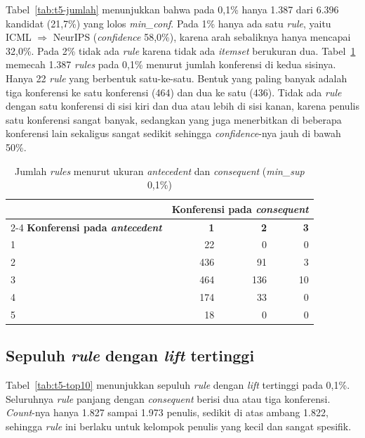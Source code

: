 Tabel~\ref{tab:t5-jumlah} menunjukkan bahwa pada 0,1\% hanya 1.387 dari 6.396 kandidat (21,7\%) yang lolos \textit{min\_conf}. Pada 1\% hanya ada satu \textit{rule}, yaitu ICML $\Rightarrow$ NeurIPS (\textit{confidence} 58,0\%), karena arah sebaliknya hanya mencapai 32,0\%. Pada 2\% tidak ada \textit{rule} karena tidak ada \textit{itemset} berukuran dua. Tabel~\ref{tab:t5-bentuk} memecah 1.387 \textit{rules} pada 0,1\% menurut jumlah konferensi di kedua sisinya. Hanya 22 \textit{rule} yang berbentuk satu-ke-satu. Bentuk yang paling banyak adalah tiga konferensi ke satu konferensi (464) dan dua ke satu (436). Tidak ada \textit{rule} dengan satu konferensi di sisi kiri dan dua atau lebih di sisi kanan, karena penulis satu konferensi sangat banyak, sedangkan yang juga menerbitkan di beberapa konferensi lain sekaligus sangat sedikit sehingga \textit{confidence}-nya jauh di bawah 50\%.

\begin{table}[ht]
\caption{Jumlah \textit{rules} menurut ukuran \textit{antecedent} dan \textit{consequent} (\textit{min\_sup} 0,1\%)}
\label{tab:t5-bentuk}
\small
\begin{tabular}{@{}lrrr@{}}
\toprule
 & \multicolumn{3}{c}{\textbf{Konferensi pada \textit{consequent}}} \\
\cmidrule(lr){2-4}
\textbf{Konferensi pada \textit{antecedent}} & \textbf{1} & \textbf{2} & \textbf{3} \\
\midrule
1 & 22 & 0 & 0 \\
2 & 436 & 91 & 3 \\
3 & 464 & 136 & 10 \\
4 & 174 & 33 & 0 \\
5 & 18 & 0 & 0 \\
\bottomrule
\end{tabular}
\end{table}

\subsection{Sepuluh \textit{rule} dengan \textit{lift} tertinggi}
\label{sec:hasil-t5-top10}
Tabel~\ref{tab:t5-top10} menunjukkan sepuluh \textit{rule} dengan \textit{lift} tertinggi pada 0,1\%. Seluruhnya \textit{rule} panjang dengan \textit{consequent} berisi dua atau tiga konferensi. \textit{Count}-nya hanya 1.827 sampai 1.973 penulis, sedikit di atas ambang 1.822, sehingga \textit{rule} ini berlaku untuk kelompok penulis yang kecil dan sangat spesifik.

